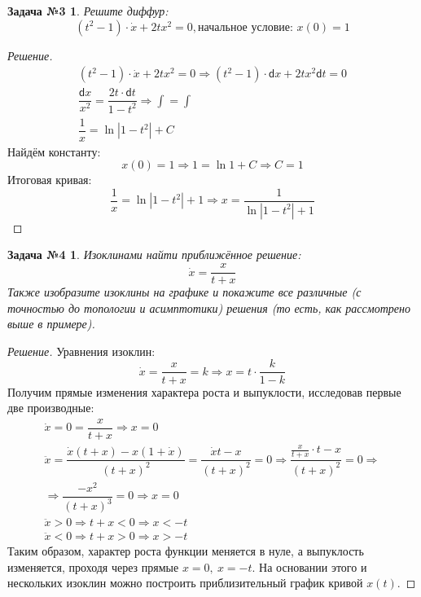 \documentclass[a4paper,12pt]{article}
\newtheorem*{task3}{Задача №3}
\newtheorem*{task4}{Задача №4}
\renewcommand{\d}{\mathsf{d}}
\newcommand{\dx}{\dot{x}}
\newcommand{\ddx}{\ddot{x}}
\newcommand{\ds}{\displaystyle}
\begin{document}
\begin{task3}
	Решите диффур: 	\[(t^2 - 1) \cdot \dot{x} + 2tx^2 = 0, \text{начальное условие: }x(0) = 1\]
\end{task3}
\begin{proof}[Решение]
	\begin{gather*}
		(t^2 - 1)\cdot \dx + 2tx^2 = 0 \Longrightarrow (t^2 - 1)\cdot \d x + 2tx^2\d t = 0\\
		\dfrac{\d x}{x^2} = \dfrac{2t \cdot \d t}{1 - t^2}\Longrightarrow \ds\int = \int\\
		\dfrac{1}{x} = \ln|1-t^2| + C
	\end{gather*}
	Найдём константу: \[x(0) = 1 \Longrightarrow 1 = \ln 1 + C \Longrightarrow C = 1\]
	Итоговая кривая:
	\[\dfrac{1}{x} = \ln|1 - t^2| + 1 \Longrightarrow x = \dfrac{1}{\ln|1 - t^2| + 1}\]
\end{proof}

\begin{task4}
	Изоклинами найти приближённое решение: 	\[\dot{x} = \dfrac{x}{t + x}\]
	Также изобразите изоклины на графике и покажите все различные (с точностью до топологии и асимптотики) решения (то есть, как рассмотрено выше в примере).
\end{task4}
\begin{proof}[Решение]
	Уравнения изоклин:
	\[\dx = \dfrac{x}{t + x} = k \Longrightarrow x = t \cdot \dfrac{k}{1 - k}\] Получим прямые изменения характера роста и выпуклости, исследовав первые две производные:
	\begin{gather*}
		\dx = 0 = \dfrac{x}{t + x} \Longrightarrow x = 0\\
		\ddx = \dfrac{\dx(t + x) - x(1 + \dx)}{(t + x)^2} = \dfrac{\dx t - x}{(t + x)^2} = 0 \Longrightarrow \dfrac{\frac{x}{t + x} \cdot t - x}{(t + x)^2} = 0 \Longrightarrow \\
		\Longrightarrow \dfrac{-x^2}{(t + x)^3} = 0 \Longrightarrow x = 0\\
		\ddx > 0 \Longrightarrow t + x < 0 \Longrightarrow x < -t\\
		\ddx < 0 \Longrightarrow t + x > 0 \Longrightarrow x > -t
	\end{gather*}
	Таким образом, характер роста функции меняется в нуле, а выпуклость изменяется, проходя через прямые $x = 0,\ x = -t$. На основании этого и нескольких изоклин можно построить приблизительный график кривой $x(t)$.
\end{proof}
\end{document}
